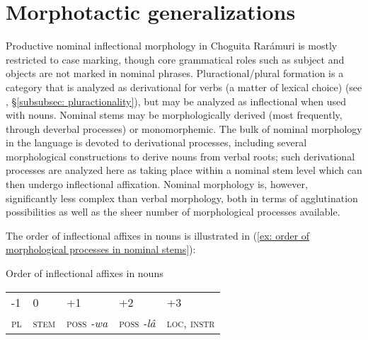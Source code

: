
\section{Morphotactic generalizations}
\label{sec: morphotactic generalizations}

Productive nominal inflectional morphology in Choguita Rarámuri is mostly restricted to case marking, though core grammatical roles such as subject and objects are not marked in nominal phrases. Pluractional/plural formation is a category that is analyzed as derivational for verbs (a matter of lexical choice) (see , §\ref{subsubsec: pluractionality}), but may be analyzed as inflectional when used with nouns. Nominal stems may be morphologically derived (most frequently, through deverbal processes) or monomorphemic. The bulk of nominal morphology in the language is devoted to derivational processes, including several morphological constructions to derive nouns from verbal roots; such derivational processes are analyzed here as taking place within a nominal stem level which can then undergo inflectional affixation. Nominal morphology is, however, significantly less complex than verbal morphology, both in terms of agglutination possibilities as well as the sheer number of morphological processes available.

The order of inflectional affixes in nouns is illustrated in (\ref{ex: order of morphological processes in nominal stems}):

\ea\label{ex: order of morphological processes in nominal stems}
{Order of inflectional affixes in nouns}

\begin{tabular}{lllll}
     -1 & 0 & +1 & +2 & +3 \\
     \textsc{pl} & \textsc{stem} & \textsc{poss} \textit{-wa} & \textsc{poss} \textit{-lâ} & \textsc{loc, instr}\\
\end{tabular}
    \z



